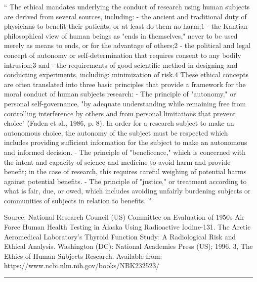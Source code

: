 \documentclass[12pt, research paper]{report}
\begin{document}
	\noindent “ The ethical mandates underlying the conduct of research using human subjects are derived from several sources, including:
	\newline - the ancient and traditional duty of physicians to benefit their patients, or at least do them no harm;1
	\newline - the Kantian philosophical view of human beings as "ends in themselves," never to be used merely as means to ends, or for the advantage of others;2
	\newline - the political and legal concept of autonomy or self-determination that requires consent to any bodily intrusion;3 and
	\newline - the requirements of good scientific method in designing and conducting experiments, including: minimization of risk.4 These ethical concepts are often translated into three basic principles that provide a framework for the moral conduct of human subjects research:
	\newline - The principle of "autonomy," or personal self-governance, "by adequate understanding while remaining free from controlling interference by others and from personal limitations that prevent choice" (Faden et al., 1986, p. 8). In order for a research subject to make an autonomous choice, the autonomy of the subject must be respected which includes providing sufficient information for the subject to make an autonomous and informed decision.
	\newline - The principle of "beneficence," which is concerned with the intent and capacity of science and medicine to avoid harm and provide benefit; in the case of research, this requires careful weighing of potential harms against potential benefits.
	\newline - The principle of "justice," or treatment according to what is fair, due, or owed, which includes avoiding unfairly burdening subjects or communities of subjects in relation to benefits. ”
	\linebreak 
	
	\noindent Source: National Research Council (US) Committee on Evaluation of 1950s Air Force Human Health Testing in Alaska Using Radioactive Iodine-131. The Arctic Aeromedical Laboratory's Thyroid Function Study: A Radiological Risk and Ethical Analysis. Washington (DC): National Academies Press (US); 1996. 3, The Ethics of Human Subjects Research. Available from: https://www.ncbi.nlm.nih.gov/books/NBK232523/ 
	
	\noindent \rule{13.85cm}{0.01cm}
\end{document}
